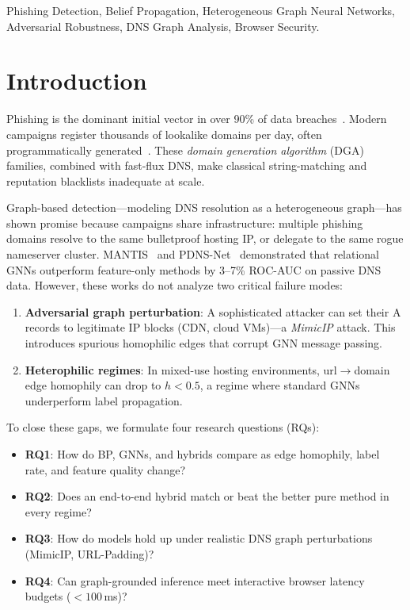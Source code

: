 \documentclass[conference]{IEEEtran}
\begin{document}
\begin{IEEEkeywords}
Phishing Detection, Belief Propagation, Heterogeneous Graph Neural Networks,
Adversarial Robustness, DNS Graph Analysis, Browser Security.
\end{IEEEkeywords}

\section{Introduction}
\label{sec:intro}

Phishing is the dominant initial vector in over 90\% of data breaches~\cite{verizon2024}.
Modern campaigns register thousands of lookalike domains per day, often
programmatically generated~\cite{plohmann2016}. These \emph{domain generation
algorithm} (DGA) families, combined with fast-flux DNS, make classical
string-matching and reputation blacklists inadequate at scale.

Graph-based detection---modeling DNS resolution as a heterogeneous graph---has
shown promise because campaigns share infrastructure: multiple phishing domains
resolve to the same bulletproof hosting IP, or delegate to the same rogue
nameserver cluster. MANTIS~\cite{mantis2022} and PDNS-Net~\cite{pdnsnet2022}
demonstrated that relational GNNs outperform feature-only methods by 3--7\%
ROC-AUC on passive DNS data. However, these works do not analyze two critical
failure modes:

\begin{enumerate}
  \item \textbf{Adversarial graph perturbation}: A sophisticated attacker can
  set their A records to legitimate IP blocks (CDN, cloud VMs)---a \emph{MimicIP}
  attack. This introduces spurious homophilic edges that corrupt GNN message
  passing.
  \item \textbf{Heterophilic regimes}: In mixed-use hosting environments,
  url$\to$domain edge homophily can drop to $h < 0.5$, a regime where standard
  GNNs underperform label propagation.
\end{enumerate}

To close these gaps, we formulate four research questions (RQs):

\begin{itemize}
  \item \textbf{RQ1}: How do BP, GNNs, and hybrids compare as edge homophily,
  label rate, and feature quality change?
  \item \textbf{RQ2}: Does an end-to-end hybrid match or beat the better pure
  method in every regime?
  \item \textbf{RQ3}: How do models hold up under realistic DNS graph
  perturbations (MimicIP, URL-Padding)?
  \item \textbf{RQ4}: Can graph-grounded inference meet interactive browser
  latency budgets ($< 100$\,ms)?
\end{itemize}
\end{document}
